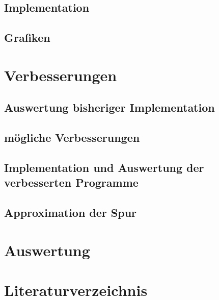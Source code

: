 \documentclass[ngerman,BCOR=4mm]{tudscrreprt}
\theoremstyle{plain} %
\theoremstyle{definition} %
\theoremstyle{remark}
\begin{document}
      \section{Implementation}

      \section{Grafiken}

\chapter{Verbesserungen}
\label{sec: Verbesserungen}
      \section{Auswertung bisheriger Implementation}

      \section{mögliche Verbesserungen}

      \section{Implementation und Auswertung der verbesserten Programme}

      \section{Approximation der Spur}

\chapter{Auswertung}
\label{sec: Auswertung}

\chapter{Literaturverzeichnis}


      \printbibliography
\end{document}
